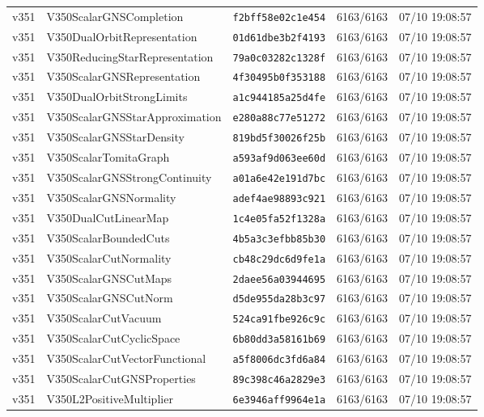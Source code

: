 \documentclass[11pt]{article}
\theoremstyle{definition}\newtheorem{deriv}{Derivação}
\begin{document}
{\begin{longtable}{@{}lllll@{}}
v351 & V350ScalarGNSCompletion & \texttt{f2bff58e02c1e454} & 6163/6163 & 07/10 19:08:57 \\
v351 & V350DualOrbitRepresentation & \texttt{01d61dbe3b2f4193} & 6163/6163 & 07/10 19:08:57 \\
v351 & V350ReducingStarRepresentation & \texttt{79a0c03282c1328f} & 6163/6163 & 07/10 19:08:57 \\
v351 & V350ScalarGNSRepresentation & \texttt{4f30495b0f353188} & 6163/6163 & 07/10 19:08:57 \\
v351 & V350DualOrbitStrongLimits & \texttt{a1c944185a25d4fe} & 6163/6163 & 07/10 19:08:57 \\
v351 & V350ScalarGNSStarApproximation & \texttt{e280a88c77e51272} & 6163/6163 & 07/10 19:08:57 \\
v351 & V350ScalarGNSStarDensity & \texttt{819bd5f30026f25b} & 6163/6163 & 07/10 19:08:57 \\
v351 & V350ScalarTomitaGraph & \texttt{a593af9d063ee60d} & 6163/6163 & 07/10 19:08:57 \\
v351 & V350ScalarGNSStrongContinuity & \texttt{a01a6e42e191d7bc} & 6163/6163 & 07/10 19:08:57 \\
v351 & V350ScalarGNSNormality & \texttt{adef4ae98893c921} & 6163/6163 & 07/10 19:08:57 \\
v351 & V350DualCutLinearMap & \texttt{1c4e05fa52f1328a} & 6163/6163 & 07/10 19:08:57 \\
v351 & V350ScalarBoundedCuts & \texttt{4b5a3c3efbb85b30} & 6163/6163 & 07/10 19:08:57 \\
v351 & V350ScalarCutNormality & \texttt{cb48c29dc6d9fe1a} & 6163/6163 & 07/10 19:08:57 \\
v351 & V350ScalarGNSCutMaps & \texttt{2daee56a03944695} & 6163/6163 & 07/10 19:08:57 \\
v351 & V350ScalarGNSCutNorm & \texttt{d5de955da28b3c97} & 6163/6163 & 07/10 19:08:57 \\
v351 & V350ScalarCutVacuum & \texttt{524ca91fbe926c9c} & 6163/6163 & 07/10 19:08:57 \\
v351 & V350ScalarCutCyclicSpace & \texttt{6b80dd3a58161b69} & 6163/6163 & 07/10 19:08:57 \\
v351 & V350ScalarCutVectorFunctional & \texttt{a5f8006dc3fd6a84} & 6163/6163 & 07/10 19:08:57 \\
v351 & V350ScalarCutGNSProperties & \texttt{89c398c46a2829e3} & 6163/6163 & 07/10 19:08:57 \\
v351 & V350L2PositiveMultiplier & \texttt{6e3946aff9964e1a} & 6163/6163 & 07/10 19:08:57 \\

\end{longtable}}
\end{document}

